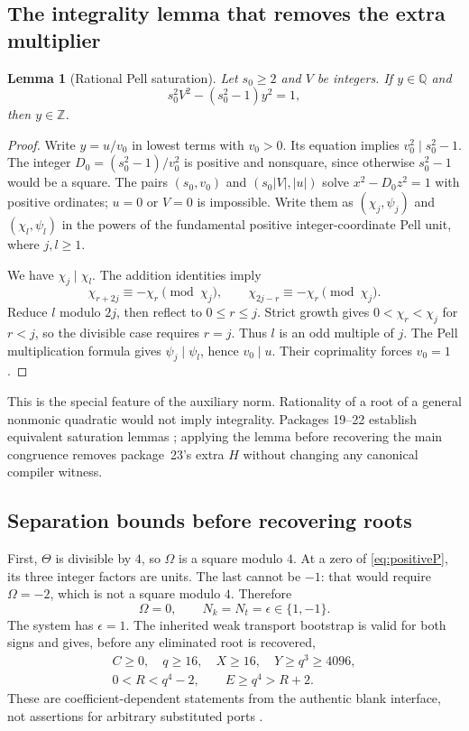 \documentclass[11pt,letterpaper]{article}
\newcommand{\Z}{\mathbb Z}
\newtheorem{lemma}[theorem]{Lemma}
\theoremstyle{remark}
\begin{document}
\subsection{The integrality lemma that removes the extra multiplier}

\begin{lemma}[Rational Pell saturation]\label{lem:saturation}
Let $s_0\ge2$ and $V$ be integers. If $y\in\mathbb Q$ and
\[
 s_0^2V^2-(s_0^2-1)y^2=1,
\]
then $y\in\Z$.
\end{lemma}
\begin{proof}
Write $y=u/v_0$ in lowest terms with $v_0>0$. Its equation implies
$v_0^2\mid s_0^2-1$. The integer
$D_0=(s_0^2-1)/v_0^2$ is positive and nonsquare, since otherwise
$s_0^2-1$ would be a square. The pairs
$(s_0,v_0)$ and $(s_0|V|,|u|)$ solve $x^2-D_0z^2=1$ with positive
ordinates; $u=0$ or $V=0$ is impossible. Write them as
$(\chi_j,\psi_j)$ and $(\chi_l,\psi_l)$ in the powers of the fundamental
positive integer-coordinate Pell unit, where $j,l\ge1$.

We have $\chi_j\mid\chi_l$. The addition identities imply
\[
 \chi_{r+2j}\equiv-\chi_r\pmod{\chi_j},\qquad
 \chi_{2j-r}\equiv-\chi_r\pmod{\chi_j}.
\]
Reduce $l$ modulo $2j$, then reflect to $0\le r\le j$.
Strict growth gives $0<\chi_r<\chi_j$ for $r<j$, so the divisible
case requires $r=j$. Thus $l$ is an odd multiple of $j$.
The Pell multiplication formula gives $\psi_j\mid\psi_l$, hence
$v_0\mid u$. Their coprimality forces $v_0=1$.
\end{proof}

This is the special feature of the auxiliary norm. Rationality of a root
of a general nonmonic quadratic would not imply integrality. Packages
19--22 establish equivalent saturation lemmas
\cite{repo19,repo20,repo21}; applying the lemma before recovering the main
congruence removes package~23's extra $H$ without changing any canonical
compiler witness.

\subsection{Separation bounds before recovering roots}

First, $\Theta$ is divisible by $4$, so $\Omega$ is a square modulo $4$.
At a zero of \eqref{eq:positiveP}, its three integer factors are units.
The last cannot be $-1$: that would require $\Omega=-2$, which is not a
square modulo $4$. Therefore
\[
 \Omega=0,\qquad N_k=N_t=\epsilon\in\{1,-1\}.
\]
The system has $\epsilon=1$. The inherited weak transport bootstrap is
valid for both signs and gives, before any eliminated root is recovered,
\begin{equation}
 \begin{gathered}
 C\ge0,\quad q\ge16,\quad X\ge16,\quad Y\ge q^3\ge4096,\\
 0<R<q^4-2,\qquad E\ge q^4>R+2.
 \end{gathered}\label{eq:weakbounds}
\end{equation}
These are coefficient-dependent statements from the authentic blank
interface, not assertions for arbitrary substituted ports
\cite{normalized,repo20,repo21}.
\end{document}
